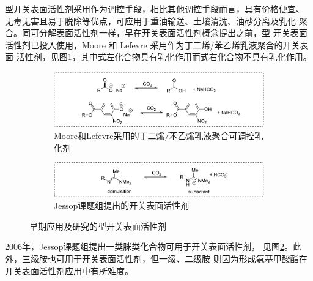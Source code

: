 \documentclass[bachelor,winfonts,replaceperiod]{jnuthesis}
\begin{document}
    型开关表面活性剂采用作为调控手段，相比其他调控手段而言，具有价格便宜、
    无毒无害且易于脱除等优点\cite{jessop2012}，可应用于重油输送、土壤清洗、油砂分离及乳化
    聚合\cite{jessop2012}。同可分解表面活性剂一样，早在开关表面活性剂概念提出之前，型
    开关表面活性剂已投入使用，Moore 和 Lefevre 采用作为丁二烯/苯乙烯乳液聚合的开关表面
    活性剂，见图\ref{fig:switchable-co2-a}，其中式左化合物具有乳化作用而式右化合物不具有乳化作用。
    \begin{figure}
    \centering
        \begin{subfigure}[b]{\textwidth}
            \centering
            \includegraphics[scale=0.8]{Figure/switchable-co2-a.pdf}
            \caption{Moore和Lefevre采用的丁二烯/苯乙烯乳液聚合可调控乳化剂}\label{fig:switchable-co2-a}
        \end{subfigure}%
    
        \begin{subfigure}[b]{\textwidth}
            \centering
            \includegraphics[scale=0.8]{Figure/switchable-co2-b.pdf}
            \caption{Jessop课题组提出的开关表面活性剂}\label{fig:switchable-co2-b}
        \end{subfigure}%
    \caption{早期应用及研究的型开关表面活性剂}
    \label{fig:switchable-co2}
    \end{figure}
    
    2006年，Jessop课题组\cite{liu2006science}提出一类脒类化合物可用于开关表面活性剂，
    见图\ref{fig:switchable-co2-b}。此外，三级胺也可用于开关表面活性剂，但一级、二级胺
    则因为形成氨基甲酸酯在开关表面活性剂应用中有所难度\cite{jessop2012}。
    
\end{document}
